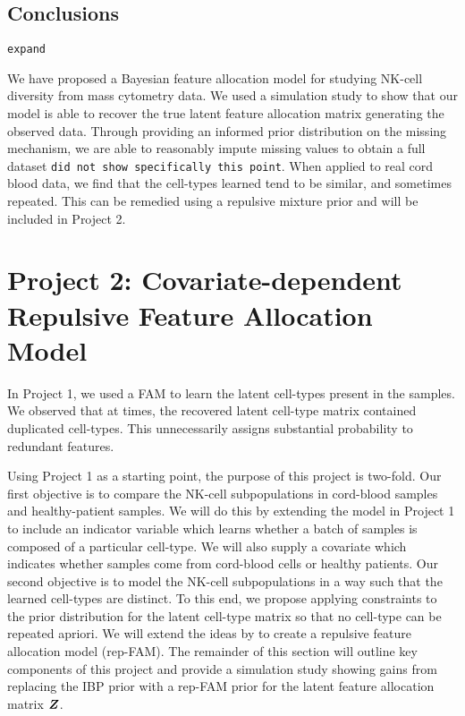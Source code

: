 \documentclass[12pt,]{article}
\newcommand{\bZ}{\mbox{\boldmath $Z$}}
\begin{document}
\subsection{Conclusions}

{\tt expand}

We have proposed a Bayesian feature allocation model for studying NK-cell
diversity from mass cytometry data. We used a simulation study to show that our
model is able to recover the true latent feature allocation matrix generating
the observed data. Through providing an informed prior distribution on the
missing mechanism, we are able to reasonably impute missing values to obtain a
full dataset
{\tt did not show specifically this point}.
%
When applied to real cord blood data, we find that the cell-types learned tend
to be similar, and sometimes repeated. This can be remedied using a repulsive
mixture prior and will be included in Project 2.

\section{Project 2: Covariate-dependent Repulsive Feature Allocation Model}\label{sec:proj2}
In Project 1, we used a FAM to learn the latent cell-types present in the
samples.  We observed that at times, the recovered latent cell-type matrix
contained duplicated cell-types. This unnecessarily assigns substantial
probability to redundant features.

Using Project 1 as a starting point, the purpose of this project is two-fold.
Our first objective is to compare the NK-cell subpopulations in cord-blood
samples and healthy-patient samples. We will do this by extending the model in
Project 1 to include an indicator variable which learns whether a batch of
samples is composed of a particular cell-type. We will also supply a covariate
which indicates whether samples come from cord-blood cells or healthy patients. 
%
Our second objective is to model the NK-cell subpopulations in a way such that
the learned cell-types are distinct. To this end, we propose applying
constraints to the prior distribution for the latent cell-type matrix so that
no cell-type can be repeated apriori. We will extend the ideas by
\cite{petralia2012repulsive} to create a repulsive feature allocation model
(rep-FAM). The remainder of this section will outline key components of this
project and provide a simulation study showing gains from replacing the IBP
prior with a rep-FAM prior for the latent feature allocation matrix $\bZ$.
\end{document}
